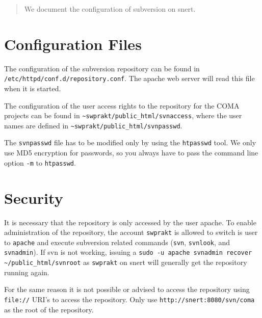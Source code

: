 \documentclass[a4paper,11pt]{article}
\begin{document}
\begin{abstract}
  We document the configuration of subversion on snert.
\end{abstract}


\section{Configuration Files}
\label{sec:config}

The configuration of the subversion repository can be found in
\texttt{/etc/httpd/conf.d/repository.conf}.  The apache web server
will read this file when it is started.

The configuration of the user access rights to the repository for the
COMA projects can be found in
\texttt{\~{}swprakt/public\_html/svnaccess}, where the user
names are defined in
\texttt{\~{}swprakt/public\_html/svnpasswd}.

The \texttt{svnpasswd} file has to be modified only by using the
\texttt{htpasswd} tool.  We only use MD5 encryption for passwords, so
you always have to pass the command line option \texttt{-m} to
\texttt{htpasswd}.



\section{Security}
\label{sec:security}

It is necessary that the repository is only accessed by the user
apache.  To enable administration of the repository, the account
\texttt{swprakt} is allowed to switch is user to \texttt{apache} and
execute subversion related commands (\texttt{svn}, \texttt{svnlook},
and \texttt{svnadmin}).  If svn is not working, issuing a
\texttt{sudo -u apache svnadmin recover \~{}/public\_html/svnroot}
as \texttt{swprakt} on snert will generally get the repository running
again.

For the same reason it is not possible or advised to access the
repository using \texttt{file://} URI's to access the repository.
Only use \texttt{http://snert:8080/svn/coma} as the root of the
repository.
\end{document}
